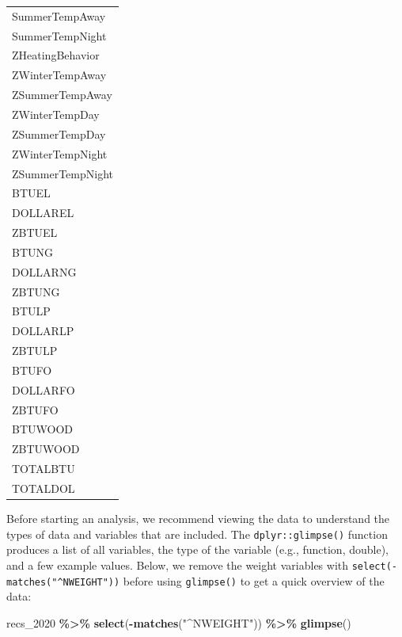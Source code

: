 \documentclass[
]{krantz}
\makeatletter
\newenvironment{Shaded}{\begin{snugshade}}{\end{snugshade}}
\newcommand{\FunctionTok}[1]{\textcolor[rgb]{0.27,0.27,0.27}{\textbf{#1}}}
\newcommand{\NormalTok}[1]{#1}
\newcommand{\SpecialCharTok}[1]{\textcolor[rgb]{0.43,0.43,0.43}{\textbf{#1}}}
\newcommand{\StringTok}[1]{\textcolor[rgb]{0.5,0.5,0.5}{#1}}
\newenvironment{kframe}{%
\medskip{}
\setlength{\fboxsep}{.8em}
 \def\at@end@of@kframe{}%
 \ifinner\ifhmode%
  \def\at@end@of@kframe{\end{minipage}}%
  \begin{minipage}{\columnwidth}%
 \fi\fi%
 \def\FrameCommand##1{\hskip\@totalleftmargin \hskip-\fboxsep
 \colorbox{shadecolor}{##1}\hskip-\fboxsep
     \hskip-\linewidth \hskip-\@totalleftmargin \hskip\columnwidth}%
 \MakeFramed {\advance\hsize-\width
   \@totalleftmargin\z@ \linewidth\hsize
   \@setminipage}}%
 {\par\unskip\endMakeFramed%
 \at@end@of@kframe}
\renewenvironment{Shaded}{\begin{kframe}}{\end{kframe}}
\makeatother
\begin{document}
\begin{longtable}{l}
SummerTempAway \\ 
SummerTempNight \\ 
ZHeatingBehavior \\ 
ZWinterTempAway \\ 
ZSummerTempAway \\ 
ZWinterTempDay \\ 
ZSummerTempDay \\ 
ZWinterTempNight \\ 
ZSummerTempNight \\ 
BTUEL \\ 
DOLLAREL \\ 
ZBTUEL \\ 
BTUNG \\ 
DOLLARNG \\ 
ZBTUNG \\ 
BTULP \\ 
DOLLARLP \\ 
ZBTULP \\ 
BTUFO \\ 
DOLLARFO \\ 
ZBTUFO \\ 
BTUWOOD \\ 
ZBTUWOOD \\ 
TOTALBTU \\ 
TOTALDOL \\ 
\bottomrule
\end{longtable}

Before starting an analysis, we recommend viewing the data to understand the types of data and variables that are included. The \texttt{dplyr::glimpse()} function produces a list of all variables, the type of the variable (e.g., function, double), and a few example values. Below, we remove the weight variables with \texttt{select(-matches("\^{}NWEIGHT"))} before using \texttt{glimpse()} to get a quick overview of the data:

\begin{Shaded}
\begin{Highlighting}[]
\NormalTok{recs\_2020 }\SpecialCharTok{\%\textgreater{}\%}
  \FunctionTok{select}\NormalTok{(}\SpecialCharTok{{-}}\FunctionTok{matches}\NormalTok{(}\StringTok{"\^{}NWEIGHT"}\NormalTok{)) }\SpecialCharTok{\%\textgreater{}\%}
  \FunctionTok{glimpse}\NormalTok{()}
\end{Highlighting}
\end{Shaded}
\end{document}
